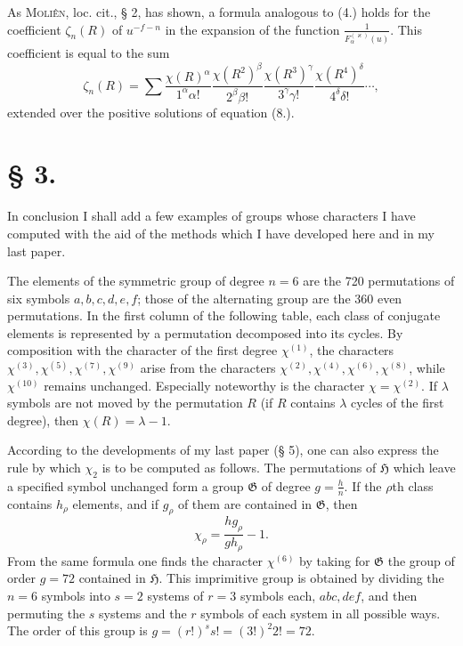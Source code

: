 \documentclass[11pt]{article}
\newcommand{\Hgr}{\mathfrak{H}}
\newcommand{\Ggr}{\mathfrak{G}}
\begin{document}
As \textsc{Moliên}, loc. cit., § 2, has shown, a formula analogous to (4.) holds for the coefficient $\zeta_n(R)$ of $u^{-f-n}$ in the expansion of the function $\frac{1}{F_\alpha^{(\varkappa)}(u)}$. This coefficient is equal to the sum
\begin{equation*}\tag{9.}
\zeta_n(R)=\sum
\frac{\chi(R)^\alpha}{1^\alpha\alpha!}
\frac{\chi(R^2)^\beta}{2^\beta\beta!}
\frac{\chi(R^3)^\gamma}{3^\gamma\gamma!}
\frac{\chi(R^4)^\delta}{4^\delta\delta!}\cdots,
\end{equation*}
extended over the positive solutions of equation (8.).

\section*{§ 3.}

In conclusion I shall add a few examples of groups whose characters I have computed with the aid of the methods which I have developed here and in my last paper.

The elements of the symmetric group of degree $n=6$ are the 720 permutations of six symbols $a,b,c,d,e,f$; those of the alternating group are the 360 even permutations. In the first column of the following table, each class of conjugate elements is represented by a permutation decomposed into its cycles. By composition with the character of the first degree $\chi^{(1)}$, the characters $\chi^{(3)},\chi^{(5)},\chi^{(7)},\chi^{(9)}$ arise from the characters $\chi^{(2)},\chi^{(4)},\chi^{(6)},\chi^{(8)}$, while $\chi^{(10)}$ remains unchanged. Especially noteworthy is the character $\chi=\chi^{(2)}$. If $\lambda$ symbols are not moved by the permutation $R$ (if $R$ contains $\lambda$ cycles of the first degree), then $\chi(R)=\lambda-1$.

According to the developments of my last paper (§ 5), one can also express the rule by which $\chi_2$ is to be computed as follows. The permutations of $\Hgr$ which leave a specified symbol unchanged form a group $\Ggr$ of degree $g=\frac{h}{n}$. If the $\rho$th class contains $h_\rho$ elements, and if $g_\rho$ of them are contained in $\Ggr$, then
\begin{equation*}\tag{1.}
\chi_\rho=\frac{h g_\rho}{g h_\rho}-1.
\end{equation*}
From the same formula one finds the character $\chi^{(6)}$ by taking for $\Ggr$ the group of order $g=72$ contained in $\Hgr$. This imprimitive group is obtained by dividing the $n=6$ symbols into $s=2$ systems of $r=3$ symbols each, $abc,def$, and then permuting the $s$ systems and the $r$ symbols of each system in all possible ways. The order of this group is $g=(r!)^s s!=(3!)^2 2!=72$.
\end{document}
